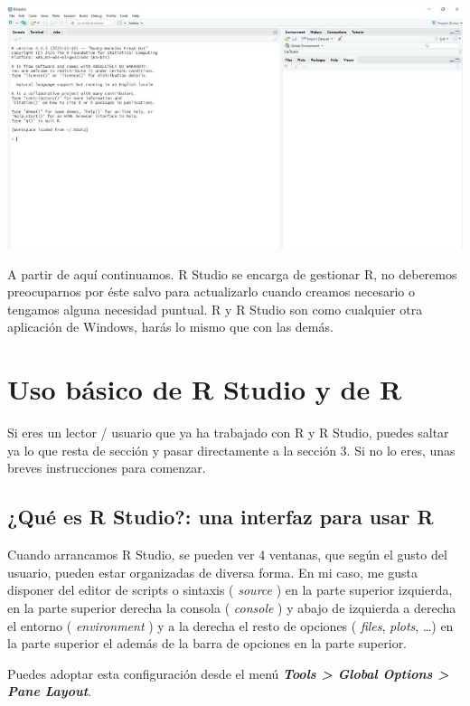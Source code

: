 \documentclass[
]{book}
\begin{document}
\includegraphics{data/R11.png}

A partir de aquí continuamos. R Studio se encarga de gestionar R, no deberemos preocuparnos por éste salvo para actualizarlo cuando creamos necesario o tengamos alguna necesidad puntual. R y R Studio son como cualquier otra aplicación de Windows, harás lo mismo que con las demás.

\hypertarget{uso-buxe1sico-de-r-studio-y-de-r}{%
\section{Uso básico de R Studio y de R}\label{uso-buxe1sico-de-r-studio-y-de-r}}

Si eres un lector / usuario que ya ha trabajado con R y R Studio, puedes saltar ya lo que resta de sección y pasar directamente a la sección 3. Si no lo eres, unas breves instrucciones para comenzar.

\hypertarget{quuxe9-es-r-studio-una-interfaz-para-usar-r}{%
\subsection{¿Qué es R Studio?: una interfaz para usar R}\label{quuxe9-es-r-studio-una-interfaz-para-usar-r}}

Cuando arrancamos R Studio, se pueden ver 4 ventanas, que según el gusto del usuario, pueden estar organizadas de diversa forma. En mi caso, me gusta disponer del editor de scripts o sintaxis ( \emph{source} ) en la parte superior izquierda, en la parte superior derecha la consola ( \emph{console} ) y abajo de izquierda a derecha el entorno ( \emph{environment} ) y a la derecha el resto de opciones ( \emph{files}, \emph{plots}, \ldots) en la parte superior el además de la barra de opciones en la parte superior.

Puedes adoptar esta configuración desde el menú \textbf{\emph{Tools \textgreater{} Global Options \textgreater{} Pane Layout}}.
\end{document}
